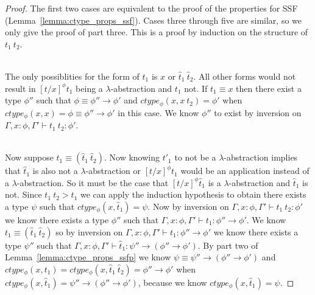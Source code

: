 \begin{proof}
  The first two cases are equivalent to the proof of the properties
  for SSF (Lemma~\ref{lemma:ctype_props_ssf}).  Cases three through five are similar, so we only give the
  proof of part three.  This is a proof by induction on the structure
  of $t_1\ t_2$.

  \ \\
  The only possiblities for the form of $t_1$ is $x$ or $\hat{t}_1\ \hat{t}_2$.  All other 
  forms would not result in $[t/x]^\phi t_1$ being a $\lambda$-abstraction and $t_1$ not.
  If $t_1 \equiv x$ then there exist a type $\phi''$ such that $\phi \equiv \phi'' \to \phi'$ and
  $ctype_\phi(x,x\ t_2) = \phi'$ when $ctype_\phi(x,x) = \phi \equiv \phi'' \to \phi'$ in this case.  We know
  $\phi''$ to exist by inversion on $\Gamma,x:\phi,\Gamma' \vdash t_1\ t_2:\phi'$.

  \ \\
  Now suppose $t_1 \equiv (\hat{t}_1\ \hat{t}_2)$.  Now knowing $t'_1$ to not be a $\lambda$-abstraction
  implies that $\hat{t}_1$ is also not a $\lambda$-abstraction or $[t/x]^\phi t_1$ would be an application
  instead of a $\lambda$-abstraction.  So it must be the case that $[t/x]^\phi \hat{t}_1$ is a $\lambda$-abstraction
  and $\hat{t}_1$ is not.  Since $t_1\ t_2 > t_1$ we can apply the induction hypothesis to obtain there exists
  a type $\psi$ such that $ctype_\phi(x,\hat{t}_1) = \psi$.  
  Now by inversion on $\Gamma,x:\phi,\Gamma' \vdash t_1\ t_2:\phi'$ we know there exists a type $\phi''$ such that
  $\Gamma,x:\phi,\Gamma' \vdash t_1:\phi'' \to \phi'$.  We know $t_1 \equiv (\hat{t}_1\ \hat{t}_2)$ so by inversion on
  $\Gamma,x:\phi,\Gamma' \vdash t_1:\phi'' \to \phi'$ we know there exists a type $\psi''$ such that
  $\Gamma,x:\phi,\Gamma' \vdash \hat{t}_1:\psi'' \to (\phi'' \to \phi')$.
  By part two of Lemma~\ref{lemma:ctype_props_ssfp} we know $\psi \equiv \psi'' \to (\phi'' \to \phi')$ and
  $ctype_\phi(x,t_1) = ctype_\phi(x,\hat{t}_1\ \hat{t}_2) = \phi'' \to \phi'$ 
  when $ctype_\phi(x,\hat{t}_1) = \psi'' \to (\phi'' \to \phi')$, because we know $ctype_\phi(x,\hat{t}_1) = \psi$.
\end{proof}

